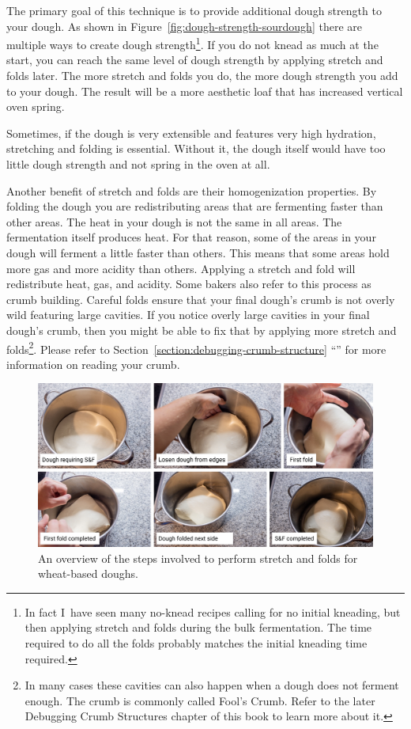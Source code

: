 The primary goal of this technique is to provide additional dough strength to
your dough. As shown in Figure~\ref{fig:dough-strength-sourdough} there are
multiple ways to create dough strength\footnote{In fact I~have seen many
    no-knead recipes calling for no initial kneading, but then applying
    stretch and folds during the bulk fermentation. The time required to do
    all the folds probably matches the initial kneading time required.}.
If you do not knead as much at the start, you can reach the same level of
dough strength by applying stretch and folds later. The more stretch and folds
you do, the more dough strength you add to your dough. The result will be a
more aesthetic loaf that has increased vertical oven spring.

Sometimes, if the dough is very extensible
and features very high hydration, stretching and folding is essential.
Without it, the dough itself would have too little dough strength and not
spring in the oven at all.

Another benefit of stretch and folds are their homogenization properties. By
folding the dough you are redistributing areas that are fermenting faster
than other areas. The heat in your dough is not the same in all areas.
The fermentation itself produces heat. For that reason, some of the areas in
your dough will ferment a little faster than others. This means that some
areas hold more gas and more acidity than others. Applying a stretch and fold
will redistribute heat, gas, and acidity. Some bakers also refer to this
process as crumb building. Careful folds ensure that your final dough's crumb
is not overly wild featuring large cavities. If you notice overly
large cavities in your final dough's crumb, then you might be able to fix that
by applying more stretch and folds\footnote{In many cases these cavities can
also happen when a dough does not ferment enough. The crumb is commonly called
Fool's Crumb. Refer to the later Debugging Crumb Structures chapter of this
book to learn more about it.}. Please refer to Section~\ref{section:debugging-crumb-structure}
``'' for more information on reading
your crumb.

\begin{figure}[!htb]
  \includegraphics[width=\textwidth]{stretch-and-fold-steps}
  \caption[Stretch and fold steps]{An overview of the steps involved to perform
      stretch and folds for wheat-based doughs.}%
  \label{figure:stretch-and-fold-steps}
\end{figure}

